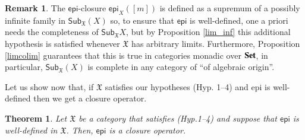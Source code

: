 \documentclass[12pt]{article}
\newtheorem{theorem}[lemma]{Theorem}
\theoremstyle{definition}
\newtheorem{remark}[lemma]{Remark}
\def\X{\mathfrak X}
\newcommand{\Set}{\textbf{\textup{Set}}}
\numberwithin{equation}{section}
\newcommand{\catname}[1]{\mathbf{#1}}
\newcommand{\sub}[1]{\mathsf{Sub}_{\catname{#1}}}
\def\epi{\mathsf{epi}}
\begin{document}
\begin{remark}
	The $\epi$-closure $\epi_X([m])$ is defined as a supremum of a possibly infinite family in $\sub\X(X)$ so, to ensure that $\epi$ is well-defined, one a priori needs the completeness of $\sub{\X}{X}$, but by Proposition \ref{lim_inf} this additional hypothesis is satisfied whenever $\X$ has arbitrary limits. Furthermore, Proposition \ref{limcolim} guarantees that this is true in categories monadic over $\Set$, in particular, $\sub{\X}(X)$ is complete in any category of ``of algebraic origin''.
\end{remark}

Let us show now that, if $\X$ satisfies our hypotheses (Hyp. 1--4) and epi is well-defined then we get a closure operator.

\begin{theorem}\label{main_thm_epi}
	Let $\X$ be a category that satisfies (Hyp.1--4) and suppose that $\epi$ is {well-defined} in $\X$. 
	Then, $\mathsf{epi}$ is a closure operator. 
\end{theorem}
\end{document}
